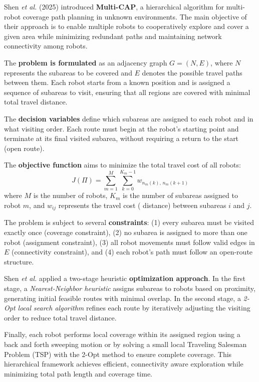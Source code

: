 
Shen \textit{et al.} (2025) \cite{shen_2025_multicap} introduced \textbf{Multi-CAP}, a hierarchical algorithm for multi-robot coverage path planning in unknown environments. The main objective of their approach is to enable multiple robots to cooperatively explore and cover a given area while minimizing redundant paths and maintaining network connectivity among robots.

The \textbf{problem is formulated} as an adjacency graph $G = (N, E)$, where $N$ represents the subareas to be covered and $E$ denotes the possible travel paths between them. Each robot starts from a known position and is assigned a sequence of subareas to visit, ensuring that all regions are covered with minimal total travel distance.

The \textbf{decision variables} define which subareas are assigned to each robot and in what visiting order. Each route must begin at the robot’s starting point and terminate at its final visited subarea, without requiring a return to the start (open route). 

The \textbf{objective function} aims to minimize the total travel cost of all robots:
\begin{equation}
J(\Pi) = \sum_{m=1}^{M} \sum_{k=0}^{K_m - 1} w_{n_m(k),\, n_m(k+1)}
\end{equation}
where $M$ is the number of robots, $K_m$ is the number of subareas assigned to robot $m$, and $w_{ij}$ represents the travel cost ( distance) between subareas $i$ and $j$.

The problem is subject to several \textbf{constraints}: 
(1) every subarea must be visited exactly once (coverage constraint), 
(2) no subarea is assigned to more than one robot (assignment constraint), 
(3) all robot movements must follow valid edges in $E$ (connectivity constraint), and 
(4) each robot’s path must follow an open-route structure.

Shen \textit{et al.} applied a two-stage heuristic \textbf{optimization approach}. In the first stage, a \textit{Nearest-Neighbor heuristic} assigns subareas to robots based on proximity, generating initial feasible routes with minimal overlap. In the second stage, a \textit{2-Opt local search algorithm} refines each route by iteratively adjusting the visiting order to reduce total travel distance.

Finally, each robot performs local coverage within its assigned region using a back and forth sweeping motion or by solving a small local Traveling Salesman Problem (TSP) with the 2-Opt method to ensure complete coverage. This hierarchical framework achieves efficient, connectivity aware exploration while minimizing total path length and coverage time.

